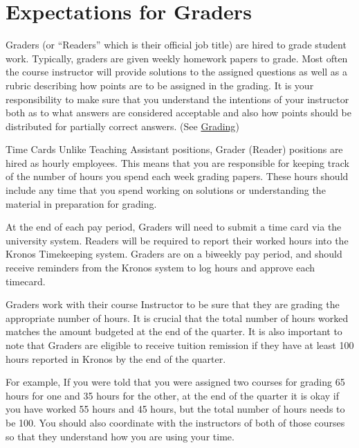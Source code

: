 \documentclass[
  letterpaper,
  DIV=11,
  numbers=noendperiod]{scrreprt}
\begin{document}
\hypertarget{expectations-for-graders-1}{%
\chapter{Expectations for Graders}\label{expectations-for-graders-1}}

Graders (or ``Readers'' which is their official job title) are hired to
grade student work. Typically, graders are given weekly homework papers
to grade. Most often the course instructor will provide solutions to the
assigned questions as well as a rubric describing how points are to be
assigned in the grading. It is your responsibility to make sure that you
understand the intentions of your instructor both as to what answers are
considered acceptable and also how points should be distributed for
partially correct answers. (See \protect\hyperlink{grading}{Grading})

Time Cards Unlike Teaching Assistant positions, Grader (Reader)
positions are hired as hourly employees. This means that you are
responsible for keeping track of the number of hours you spend each week
grading papers. These hours should include any time that you spend
working on solutions or understanding the material in preparation for
grading.

At the end of each pay period, Graders will need to submit a time card
via the university system. Readers will be required to report their
worked hours into the Kronos Timekeeping system. Graders are on a
biweekly pay period, and should receive reminders from the Kronos system
to log hours and approve each timecard.

Graders work with their course Instructor to be sure that they are
grading the appropriate number of hours. It is crucial that the total
number of hours worked matches the amount budgeted at the end of the
quarter. It is also important to note that Graders are eligible to
receive tuition remission if they have at least 100 hours reported in
Kronos by the end of the quarter.

For example, If you were told that you were assigned two courses for
grading 65 hours for one and 35 hours for the other, at the end of the
quarter it is okay if you have worked 55 hours and 45 hours, but the
total number of hours needs to be 100. You should also coordinate with
the instructors of both of those courses so that they understand how you
are using your time.
\end{document}
